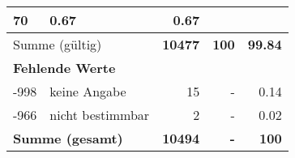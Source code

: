 \begin{longtable}{lXrrr}
       \num{70} &
       \num[round-mode=places,round-precision=2]{0,67} &
         \num[round-mode=places,round-precision=2]{0,67} \\
     \midrule
     \multicolumn{2}{l}{Summe (gültig)} &
       \textbf{\num{10477}} &
     \textbf{100} &
       \textbf{\num[round-mode=places,round-precision=2]{99,84}} \\
     \multicolumn{5}{l}{\textbf{Fehlende Werte}}\\
       -998 &
       keine Angabe &
         \num{15} &
        - &
         \num[round-mode=places,round-precision=2]{0,14} \\
       -966 &
       nicht bestimmbar &
         \num{2} &
        - &
         \num[round-mode=places,round-precision=2]{0,02} \\
     \midrule
     \multicolumn{2}{l}{\textbf{Summe (gesamt)}} &
          \textbf{\num{10494}} &
        \textbf{-} &
        \textbf{100} \\
     \bottomrule
     \end{longtable}
     
